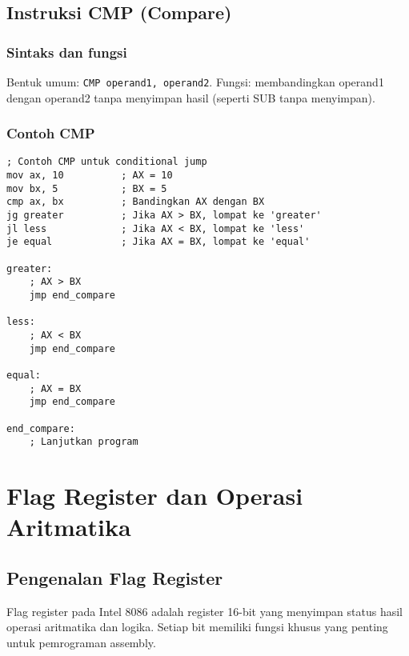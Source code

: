 \documentclass[../main.tex]{subfiles}
\begin{document}
        \subsection{Instruksi CMP (Compare)}
            \subsubsection{Sintaks dan fungsi}
Bentuk umum: \texttt{CMP operand1, operand2}. Fungsi: membandingkan operand1 dengan operand2 tanpa menyimpan hasil (seperti SUB tanpa menyimpan).

            \subsubsection{Contoh CMP}
\begin{lstlisting}[language={[x86masm]Assembler}, caption=Instruksi CMP, label={lst:cmp-examples}]
; Contoh CMP untuk conditional jump
mov ax, 10          ; AX = 10
mov bx, 5           ; BX = 5
cmp ax, bx          ; Bandingkan AX dengan BX
jg greater          ; Jika AX > BX, lompat ke 'greater'
jl less             ; Jika AX < BX, lompat ke 'less'
je equal            ; Jika AX = BX, lompat ke 'equal'

greater:
    ; AX > BX
    jmp end_compare

less:
    ; AX < BX
    jmp end_compare

equal:
    ; AX = BX
    jmp end_compare

end_compare:
    ; Lanjutkan program
\end{lstlisting}

    \section{Flag Register dan Operasi Aritmatika}

        \subsection{Pengenalan Flag Register}
            Flag register pada Intel 8086 adalah register 16-bit yang menyimpan status hasil operasi aritmatika dan logika. Setiap bit memiliki fungsi khusus yang penting untuk pemrograman assembly.
\end{document}
